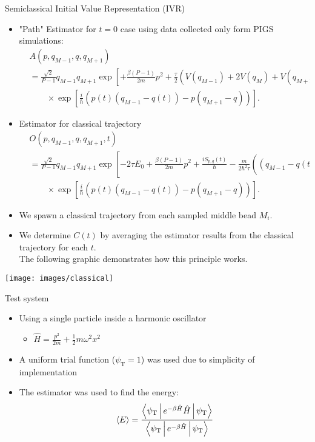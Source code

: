 \documentclass[final,t]{beamer}
\newcommand{\psiT}{\psi_{\textrm{T}}}
\newcommand{\expb}[1]{\ensuremath{\exp{\left[ #1 \right]}}}
\begin{document}
\begin{frame}{}
\begin{columns}[T]
\begin{column}{.37\linewidth}
	\begin{block}{Semiclassical Initial Value Representation (IVR)}
		\begin{itemize}
			\item "Path" Estimator for $t=0$ case using data collected only form PIGS simulations:
			\begin{align*}
				& A(p, q_{M-1}, q, q_{M+1}) \\
				&= \frac{\sqrt{2}}{P-1} q_{M-1} q_{M+1}
					\expb{
						+ \frac{\beta (P-1)}{2 m} p^2
						+ \frac{\tau}{2}(V(q_{M-1}) + 2V(q_{M}) +V(q_{M+1}))
						- \frac{i}{\hbar}p(q_{M+1} - q_{M-1})
					} \\
				&\qquad\times
					\expb{
						\frac{i}{\hbar} \left( p(t) (q_{M-1} - q(t)) - p (q_{M+1} - q) \right)
					}.
			\end{align*}
			\item Estimator for classical trajectory
			\begin{align*}
				& O(p, q_{M-1}, q, q_{M+1}, t) \\
				&= \frac{\sqrt{2}}{P-1} q_{M-1} q_{M+1}
					\expb{
						-2 \tau E_0
						+ \frac{\beta (P-1)}{2 m} p^2
						+ \frac{i S_{p,q}(t)}{\hbar}
						- \frac{m}{2 \hbar^2 \tau} \left( (q_{M-1} - q(t))^2 - (q_{M+1} - q)^2 \right)
					} \\
				&\qquad\times
					\expb{
						\frac{i}{\hbar} \left( p(t) (q_{M-1} - q(t)) - p (q_{M+1} - q) \right)
					}.
			\end{align*}		
			\item We spawn a classical trajectory from each sampled middle bead $M_{i}$.
			\item We determine  $C(t)$ by averaging the estimator results from the classical trajectory for each $t$. \\
			The following graphic demonstrates how this principle works.
		\end{itemize}
		\texttt{[image: images/classical]}
	\end{block}
	\begin{block}{Test system}
		\begin{itemize}
			\item Using a single particle inside a harmonic oscillator
				\begin{itemize}
					\item $\hat{H} = \frac{p^2}{2m} + \frac{1}{2} m \omega^{2} x^{2} $
				\end{itemize}
			\item A uniform trial function ($\psiT = 1$) was used due to simplicity of implementation
			\item The  estimator was used to find the energy:
					$$
						\langle E \rangle
						= \frac{\Braket{\psiT | e^{-\beta \hat{H}} \hat{H} | \psiT}}{\Braket{\psiT | e^{-\beta \hat{H}} | \psiT}}
					$$
			

\end{itemize}
\end{block}
\end{column}
\end{columns}
\end{frame}
\end{document}
